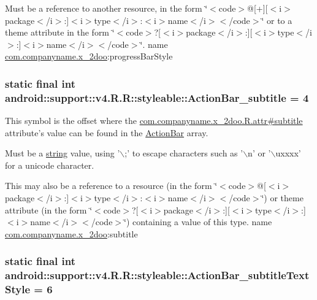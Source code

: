 Must be a reference to another resource, in the form \char`\"{}$<$code$>$@\mbox{[}+\mbox{]}\mbox{[}$<$i$>$package$<$/i$>$:\mbox{]}$<$i$>$type$<$/i$>$:$<$i$>$name$<$/i$>$$<$/code$>$\char`\"{} or to a theme attribute in the form \char`\"{}$<$code$>$?\mbox{[}$<$i$>$package$<$/i$>$:\mbox{]}\mbox{[}$<$i$>$type$<$/i$>$:\mbox{]}$<$i$>$name$<$/i$>$$<$/code$>$\char`\"{}.  name \hyperlink{namespacecom_1_1companyname_1_1x__2doo}{com.companyname.x\_\-2doo}:progressBarStyle \hypertarget{classandroid_1_1support_1_1v4_1_1_r_1_1styleable_b13c54236519fed1addd3ca8eb816d6d}{
\subsubsection[{ActionBar\_\-subtitle}]{\setlength{\rightskip}{0pt plus 5cm}static final int android::support::v4.R.R::styleable::ActionBar\_\-subtitle = 4}}
\label{classandroid_1_1support_1_1v4_1_1_r_1_1styleable_b13c54236519fed1addd3ca8eb816d6d}


This symbol is the offset where the \hyperlink{classcom_1_1companyname_1_1x__2doo_1_1_r_1_1attr_98394940b75038e43d2df2a9cb49c7b9}{com.companyname.x\_\-2doo.R.attr\#subtitle} attribute's value can be found in the \hyperlink{classandroid_1_1support_1_1v4_1_1_r_1_1styleable_5c6cf2c83551ebae05f365bb913fdddf}{ActionBar} array.

Must be a \hyperlink{classandroid_1_1support_1_1v4_1_1_r_1_1string}{string} value, using '$\backslash$;' to escape characters such as '$\backslash$n' or '$\backslash$uxxxx' for a unicode character. 

This may also be a reference to a resource (in the form \char`\"{}$<$code$>$@\mbox{[}$<$i$>$package$<$/i$>$:\mbox{]}$<$i$>$type$<$/i$>$:$<$i$>$name$<$/i$>$$<$/code$>$\char`\"{}) or theme attribute (in the form \char`\"{}$<$code$>$?\mbox{[}$<$i$>$package$<$/i$>$:\mbox{]}\mbox{[}$<$i$>$type$<$/i$>$:\mbox{]}$<$i$>$name$<$/i$>$$<$/code$>$\char`\"{}) containing a value of this type.  name \hyperlink{namespacecom_1_1companyname_1_1x__2doo}{com.companyname.x\_\-2doo}:subtitle \hypertarget{classandroid_1_1support_1_1v4_1_1_r_1_1styleable_8ebb80bb063e0a82480659b40929e291}{
\subsubsection[{ActionBar\_\-subtitleTextStyle}]{\setlength{\rightskip}{0pt plus 5cm}static final int android::support::v4.R.R::styleable::ActionBar\_\-subtitleTextStyle = 6}}
\label{classandroid_1_1support_1_1v4_1_1_r_1_1styleable_8ebb80bb063e0a82480659b40929e291}


